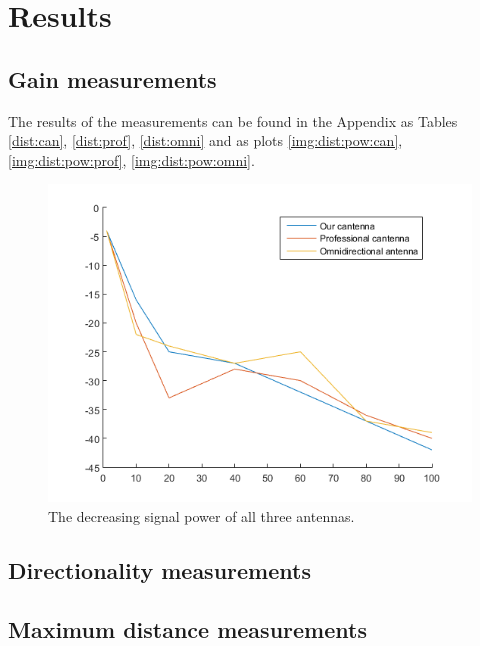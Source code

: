 \documentclass[12pt,a4paper]{article}
\begin{document}
\section{Results}
 
	\subsection{Gain measurements}
		
		The results of the measurements can be found in the Appendix as Tables \autoref{dist:can}, \autoref{dist:prof}, \autoref{dist:omni} and as plots \autoref{img:dist:pow:can}, \autoref{img:dist:pow:prof}, \autoref{img:dist:pow:omni}.
		
		
	
		\begin{figure}
			\includegraphics[width=\textwidth]{plots/all_power.png}
			\caption{The decreasing signal power of all three antennas.}
			\label{all:power}
		\end{figure}

	\subsection{Directionality measurements}

	\subsection{Maximum distance measurements}
		
\end{document}
